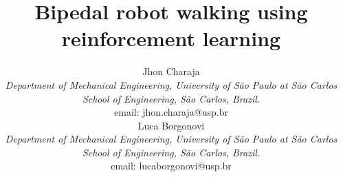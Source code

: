 \documentclass[conference]{IEEEtran}
\newcommand{\email}[1]{email: #1}
\begin{document}
\title{Bipedal robot walking using reinforcement learning}

\author{
\begin{minipage}{0.40\textwidth}
	\centering
	Jhon Charaja \\
	\small{\textit{Department of Mechanical Engineering, University of S\~ao Paulo at S\~ao Carlos School of Engineering, S\~ao Carlos, Brazil.} } \\
	\email{jhon.charaja@usp.br}
\end{minipage}
\hfill
\begin{minipage}{0.40\textwidth}
	\centering
	Luca Borgonovi \\
	\small{\textit{Department of Mechanical Engineering, University of S\~ao Paulo at S\~ao Carlos School of Engineering, S\~ao Carlos, Brazil.} } \\
	\email{lucaborgonovi@usp.br}
\end{minipage}
}
	
\maketitle









	
\end{document}
